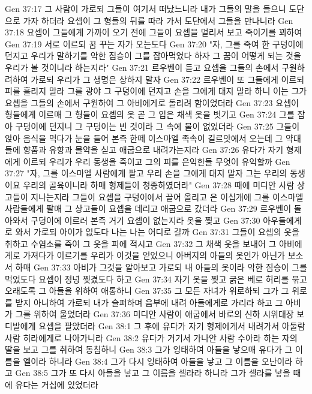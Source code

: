 Gen 37:17  그 사람이 가로되 그들이 여기서 떠났느니라 내가 그들의 말을 들으니 도단으로 가자 하더라 요셉이 그 형들의 뒤를 따라 가서 도단에서 그들을 만나니라
Gen 37:18  요셉이 그들에게 가까이 오기 전에 그들이 요셉을 멀리서 보고 죽이기를 꾀하여
Gen 37:19  서로 이르되 꿈 꾸는 자가 오는도다
Gen 37:20  "자, 그를 죽여 한 구덩이에 던지고 우리가 말하기를 악한 짐승이 그를 잡아먹었다 하자 그 꿈이 어떻게 되는 것을 우리가 볼 것이니라 하는지라"
Gen 37:21  르우벤이 듣고 요셉을 그들의 손에서 구원하려하여 가로되 우리가 그 생명은 상하지 말자
Gen 37:22  르우벤이 또 그들에게 이르되 피를 흘리지 말라 그를 광야 그 구덩이에 던지고 손을 그에게 대지 말라 하니 이는 그가 요셉을 그들의 손에서 구원하여 그 아비에게로 돌리려 함이었더라
Gen 37:23  요셉이 형들에게 이르매 그 형들이 요셉의 옷 곧 그 입은 채색 옷을 벗기고
Gen 37:24  그를 잡아 구덩이에 던지니 그 구덩이는 빈 것이라 그 속에 물이 없었더라
Gen 37:25  그들이 앉아 음식을 먹다가 눈을 들어 본즉 한떼 이스마엘 족속이 길르앗에서 오는데 그 약대들에 향품과 유향과 몰약을 싣고 애굽으로 내려가는지라
Gen 37:26  유다가 자기 형제에게 이르되 우리가 우리 동생을 죽이고 그의 피를 은익한들 무엇이 유익할까
Gen 37:27  "자, 그를 이스마엘 사람에게 팔고 우리 손을 그에게 대지 말자 그는 우리의 동생이요 우리의 골육이니라 하매 형제들이 청종하였더라"
Gen 37:28  때에 미디안 사람 상고들이 지나는지라 그들이 요셉을 구덩이에서 끌어 올리고 은 이십개에 그를 이스마엘 사람들에게 팔매 그 상고들이 요셉을 데리고 애굽으로 갔더라
Gen 37:29  르우벤이 돌아와서 구덩이에 이르러 본즉 거기 요셉이 없는지라 옷을 찢고
Gen 37:30  아우들에게로 와서 가로되 아이가 없도다 나는 나는 어디로 갈까
Gen 37:31  그들이 요셉의 옷을 취하고 수염소를 죽여 그 옷을 피에 적시고
Gen 37:32  그 채색 옷을 보내어 그 아비에게로 가져다가 이르기를 우리가 이것을 얻었으니 아버지의 아들의 옷인가 아닌가 보소서 하매
Gen 37:33  아비가 그것을 알아보고 가로되 내 아들의 옷이라 악한 짐승이 그를 먹었도다 요셉이 정녕 찢겼도다 하고
Gen 37:34  자기 옷을 찢고 굵은 베로 허리를 묶고 오래도록 그 아들을 위하여 애통하니
Gen 37:35  그 모든 자녀가 위로하되 그가 그 위로를 받지 아니하여 가로되 내가 슬퍼하며 음부에 내려 아들에게로 가리라 하고 그 아비가 그를 위하여 울었더라
Gen 37:36  미디안 사람이 애굽에서 바로의 신하 시위대장 보디발에게 요셉을 팔았더라
Gen 38:1  그 후에 유다가 자기 형제에게서 내려가서 아둘람 사람 히라에게로 나아가니라
Gen 38:2  유다가 거기서 가나안 사람 수아라 하는 자의 딸을 보고 그를 취하여 동침하니
Gen 38:3  그가 잉태하여 아들을 낳으매 유다가 그 이름을 엘이라 하니라
Gen 38:4  그가 다시 잉태하여 아들을 낳고 그 이름을 오난이라 하고
Gen 38:5  그가 또 다시 아들을 낳고 그 이름을 셀라라 하니라 그가 셀라를 낳을 때에 유다는 거십에 있었더라
